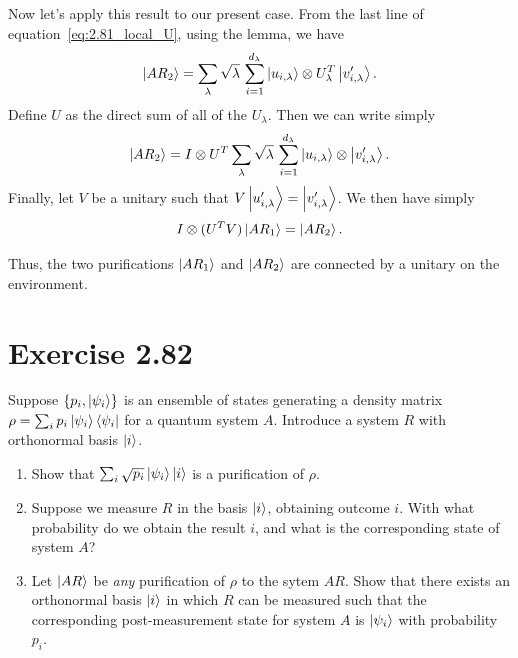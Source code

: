 \documentclass{book}
\begin{document}
    Now let's apply this result to our present case. From the last line of equation~\eqref{eq:2.81_local_U}, using the lemma, we have
    \begin{align}
    \begin{aligned}
        \ket{A R_2} = \sum_\lambda \sqrt{\lambda} \,  \sum_{i=1}^{d_\lambda}\ket{u_{i,\lambda}}\otimes U_\lambda^T \ket{v_{i,\lambda}'}.
    \end{aligned}
    \end{align}
    Define $U$ as the direct sum of all of the $U_\lambda$. Then we can write simply
    \begin{align}
        \ket{A R_2} = I \otimes U^T \sum_\lambda \sqrt{\lambda} \,  \sum_{i=1}^{d_\lambda}\ket{u_{i,\lambda}}\otimes \ket{v_{i,\lambda}'}.
    \end{align}
    Finally, let $V$ be a unitary such that $V \ket{u_{i,\lambda}'} = \ket{v_{i,\lambda}'}$. We then have simply
    \begin{align}
        I \otimes (U^T V) \ket{A R_1} = \ket{A R_2}.
    \end{align}

    Thus, the two purifications $\ket{A R_1}$ and $\ket{A R_2}$ are connected by a unitary on the environment.
    
\section*{Exercise 2.82}
    Suppose $\{p_i, \ket{\psi_i}\}$ is an ensemble of states generating a density matrix $\rho = \sum_i p_i \ket{\psi_i}\bra{\psi_i}$ for a quantum system $A$. Introduce a system $R$ with orthonormal basis $\ket{i}$.

    \begin{enumerate}
        \item Show that $\sum_i \sqrt{p_i} \ket{\psi_i}\ket{i}$ is a purification of $\rho$.
        \item Suppose we measure $R$ in the basis $\ket{i}$, obtaining outcome $i$. With what probability do we obtain the result $i$, and what is the corresponding state of system $A$?
        \item Let $\ket{AR}$ be \emph{any} purification of $\rho$ to the sytem $AR$. Show that there exists an orthonormal basis $\ket{i}$ in which $R$ can be measured such that the corresponding post-measurement state for system $A$ is $\ket{\psi_i}$ with probability $p_i$.
    \end{enumerate}
\end{document}
